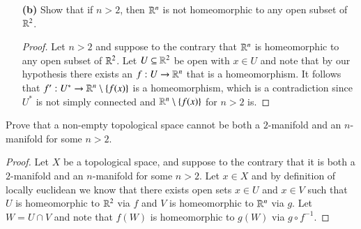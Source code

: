 \documentclass{homework651}
\newcommand{\bbB}{\mathbb{B}}
\begin{document}
\begin{problems}
\begin{enumerate}
\begin{proof}
        Since $U \subseteq \RR^2$ we can define $V = \overline{\bbB_r(x)} \subseteq U$ and $V^* = V \setminus \{x\}$ and consider $p \in V^*$. Note that $\iota_{V^*}: V^* \to U^*$, the embedding of $V^*$ into $U^*$ is continuous, and therefore induces a homomorphism $\iota_V^*: \pi_1(V^*, p) \to \pi_1(U^*, p)$. 

        Now note that via Lemma 1, up to a translation of the origin, $V$ is a retraction of $\RR^2 \setminus \{x\}$ and therefore we can construct a continuous function $r':\RR^2 \setminus \{x\} \to V^*$ such that $\iota_{V^*} \circ r' = Id_V$. Note that since $U^* \subseteq \RR^*$ and $V^* \subseteq U^*$ we can construct a retraction from $r : U^* \to V^*$ by $r = r'\circ \iota_{U^*}$.
        This function is continuous, and therefore induces a homomorphism $r^*:  \pi_1(U^*, p)\to \pi_1(V^*, p)$.
        
        Let $[j] \in \pi_1(V^*, p)$ and note that composing these homomorphisms, we get the identity map on $\pi_1(V^*, p)$,
        \begin{equation*}
            r^* \circ \iota_V^* ([j]) = r^*([\iota_{V^*}(j)]) = r^*([j]) = [r(j)] = [r'(\iota_{U^*}(j))] = [j]
        \end{equation*}
        However since $U^*$ is simply connected we know that $\pi_1(U^*, p)$ is trivial. Since $ r^* \circ \iota_V^*$ is the identity map on $\pi_1(V^*, p)$ it follows that $\pi_1(V^*, p)$ must have been trivial as well, which is a contradiction since $\pi_1(U^*, p)$ is isomorphic to $\pi_1(S^1, x)$. 
    \end{proof}




    \item[\textbf{(b)}] Show that if $n > 2$, then $\mathbb R^n$ is not homeomorphic to any open subset of $\mathbb R^2$.
    \begin{proof} Let $n > 2$ and suppose to the contrary that $\mathbb R^n$ is homeomorphic to any open subset of $\mathbb R^2$. Let $U \subseteq \RR^2$ be open with $x \in U$ and note that by our hypothesis there exists an $f: U \to \mathbb R^n$ that is a homeomorphism. It follows that $f': U^* \to \mathbb R^n \setminus \{f(x)\}$ is a homeomorphism, which is a contradiction since $U^*$ is not simply connected and $\mathbb R^n \setminus \{f(x)\}$ for $n > 2$ is. 
    \end{proof}
\end{enumerate}



\problem Prove that a non-empty topological space cannot be both a $2$-manifold and an $n$-manifold for some $n> 2$. 
\begin{proof} Let $X$ be a topological space, and suppose to the contrary that it is both a $2$-manifold and an $n$-manifold for some $n> 2$. Let $x \in X$ and by definition of locally euclidean we know that there exists open sets $x \in U$ and $x \in V$ such that $U$ is homeomorphic to $\mathbb R^2$ via $f$ and 
    $V$ is homeomorphic to $\mathbb R^n$ via $g$. Let $W = U \cap V$ and note that $f(W)$ is homeomorphic to 
    $g(W)$ via $g \circ f^{-1}$.



\end{proof}
\end{problems}
\end{document}
